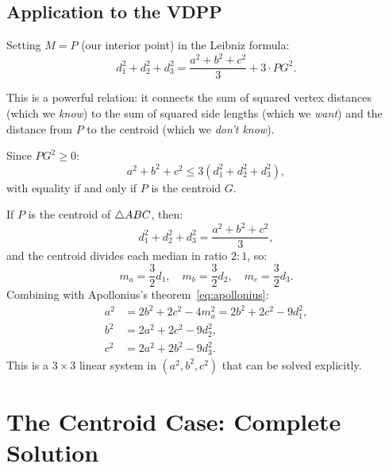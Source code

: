 \subsection{Application to the VDPP}

Setting $M = P$ (our interior point) in the Leibniz formula:
\begin{equation}
\label{eq:leibniz-vdpp}
\boxed{d_1^2 + d_2^2 + d_3^2 = \frac{a^2 + b^2 + c^2}{3} + 3 \cdot PG^2.}
\end{equation}

This is a powerful relation: it connects the sum of squared vertex distances (which we \emph{know}) to the sum of squared side lengths (which we \emph{want}) and the distance from $P$ to the centroid (which we \emph{don't know}).

\begin{corollary}
\label{cor:leibniz-bound}
Since $PG^2 \geq 0$:
\begin{equation}
a^2 + b^2 + c^2 \leq 3(d_1^2 + d_2^2 + d_3^2),
\end{equation}
with equality if and only if $P$ is the centroid $G$.
\end{corollary}

\begin{corollary}
\label{cor:centroid}
If $P$ is the centroid of $\triangle ABC$, then:
\begin{equation}
d_1^2 + d_2^2 + d_3^2 = \frac{a^2 + b^2 + c^2}{3},
\end{equation}
and the centroid divides each median in ratio $2:1$, so:
\begin{equation}
m_a = \frac{3}{2}d_1, \quad m_b = \frac{3}{2}d_2, \quad m_c = \frac{3}{2}d_3.
\end{equation}
Combining with Apollonius's theorem~\eqref{eq:apollonius}:
\begin{align}
a^2 &= 2b^2 + 2c^2 - 4m_a^2 = 2b^2 + 2c^2 - 9d_1^2, \\
b^2 &= 2a^2 + 2c^2 - 9d_2^2, \\
c^2 &= 2a^2 + 2b^2 - 9d_3^2.
\end{align}
This is a $3 \times 3$ linear system in $(a^2, b^2, c^2)$ that can be solved explicitly.
\end{corollary}

\section{The Centroid Case: Complete Solution}

